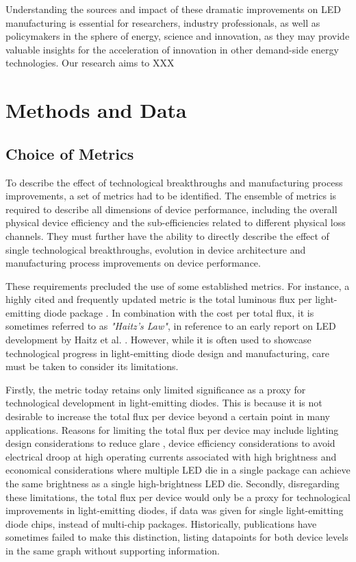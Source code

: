 \documentclass[a4paper,nocompress]{spie}  %
\begin{document}
    Understanding the sources and impact of these dramatic improvements on LED manufacturing is essential for researchers, industry professionals, as well as policymakers in the sphere of energy, science and innovation, as they may provide valuable insights for the acceleration of innovation in other demand-side energy technologies. Our research aims to XXX


\clearpage
\section{Methods and Data}
\label{sec:methods}

\subsection{Choice of Metrics}

    To describe the effect of technological breakthroughs and manufacturing process improvements, a set of metrics had to be identified. The ensemble of metrics is required to describe all dimensions of device performance, including the overall physical device efficiency and the sub-efficiencies related to different physical loss channels. They must further have the ability to directly describe the effect of single technological breakthroughs, evolution in device architecture and manufacturing process improvements on device performance.
    
    These requirements precluded the use of some established metrics. For instance, a highly cited and frequently updated metric is the total luminous flux per light-emitting diode package \cite{Liu2009,haitz2011solid,cho2017white,Fontoynont2018}. In combination with the cost per total flux, it is sometimes referred to as \textit{"Haitz's Law"}, in reference to an early report on LED development by Haitz et al. \cite{haitz1999case}. However, while it is often used to showcase technological progress in light-emitting diode design and manufacturing, care must be taken to consider its limitations.
    
    Firstly, the metric today retains only limited significance as a proxy for technological development in light-emitting diodes. This is because it is not desirable to increase the total flux per device beyond a certain point in many applications. Reasons for limiting the total flux per device may include lighting design considerations to reduce glare \cite{khan2015led}, device efficiency considerations to avoid electrical droop at high operating currents associated with high brightness \cite{Piprek2010} and economical considerations where multiple LED die in a single package can achieve the same brightness as a single high-brightness LED die. Secondly, disregarding these limitations, the total flux per device would only be a proxy for technological improvements in light-emitting diodes, if data was given for single light-emitting diode chips, instead of multi-chip packages. Historically, publications have sometimes failed to make this distinction, listing datapoints for both device levels in the same graph without supporting information.
\end{document}
